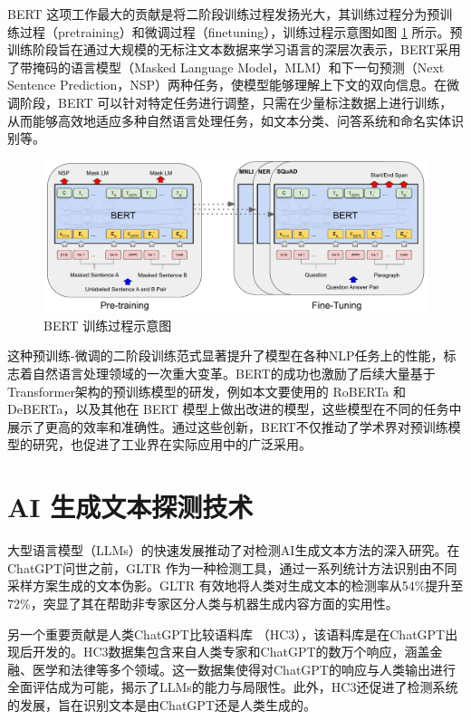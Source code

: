 BERT 这项工作最大的贡献是将二阶段训练过程发扬光大，其训练过程分为预训练过程（pretraining）和微调过程（finetuning），训练过程示意图如图 \ref{fig:BERT-OverAll} 所示。预训练阶段旨在通过大规模的无标注文本数据来学习语言的深层次表示，BERT采用了带掩码的语言模型（Masked Language Model，MLM）和下一句预测（Next Sentence Prediction，NSP）两种任务，使模型能够理解上下文的双向信息。在微调阶段，BERT 可以针对特定任务进行调整，只需在少量标注数据上进行训练，从而能够高效地适应多种自然语言处理任务，如文本分类、问答系统和命名实体识别等。

\begin{figure}[htbp]
	\centering
	\includegraphics[width=\linewidth]{figures/BERT_Overall.pdf}
	\caption{BERT 训练过程示意图}
	\label{fig:BERT-OverAll}
\end{figure}

这种预训练-微调的二阶段训练范式显著提升了模型在各种NLP任务上的性能，标志着自然语言处理领域的一次重大变革。BERT的成功也激励了后续大量基于Transformer架构的预训练模型的研发，例如本文要使用的 RoBERTa 和 DeBERTa，以及其他在 BERT 模型上做出改进的模型，这些模型在不同的任务中展示了更高的效率和准确性。通过这些创新，BERT不仅推动了学术界对预训练模型的研究，也促进了工业界在实际应用中的广泛采用。

\section{AI 生成文本探测技术}
\label{sec:llmdetect}

大型语言模型（LLMs）的快速发展推动了对检测AI生成文本方法的深入研究。在ChatGPT问世之前，GLTR \cite{gehrmann_gltr_2019} 作为一种检测工具，通过一系列统计方法识别由不同采样方案生成的文本伪影。GLTR 有效地将人类对生成文本的检测率从54\%提升至72\%，突显了其在帮助非专家区分人类与机器生成内容方面的实用性。

另一个重要贡献是人类ChatGPT比较语料库 \cite{guo_how_2023}（HC3），该语料库是在ChatGPT出现后开发的。HC3数据集包含来自人类专家和ChatGPT的数万个响应，涵盖金融、医学和法律等多个领域。这一数据集使得对ChatGPT的响应与人类输出进行全面评估成为可能，揭示了LLMs的能力与局限性。此外，HC3还促进了检测系统的发展，旨在识别文本是由ChatGPT还是人类生成的。

